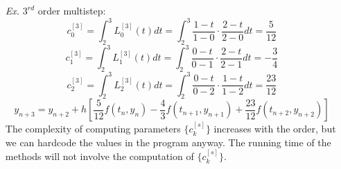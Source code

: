 \documentclass[a4paper, 11pt]{article}
\begin{document}
\begin{itemize}
	\item[\textit{Ex.}] $3^{rd}$ order multistep:
	$$
	c_0^{[3]} = \int_2^3 L_0^{[3]}(t)dt = \int_2^3 \frac{1-t}{1-0}\cdot \frac{2-t}{2-0}dt = \frac{5}{12}
	$$
	$$
	c_1^{[3]} = \int_2^3 L_1^{[3]}(t)dt = \int_2^3 \frac{0-t}{0-1}\cdot \frac{2-t}{2-1}dt = -\frac{3}{4}
	$$
	$$
	c_2^{[3]} = \int_2^3 L_2^{[3]}(t)dt = \int_2^3 \frac{0-t}{0-2}\cdot \frac{1-t}{1-2}dt = \frac{23}{12}
	$$
	$$
	y_{n+3} = y_{n+2} + h \left[\frac{5}{12}f(t_n, y_n)-\frac{4}{3}f(t_{n+1}, y_{n+1})+\frac{23}{12}f(t_{n+2}, y_{n+2})\right]
	$$
	The complexity of computing parameters $\{c_k^{[s]}\}$ increases with the order, but we can hardcode the values in the program anyway. The running time of the methods will not involve the computation of $\{c_k^{[s]}\}$.
\end{itemize}
\end{document}
